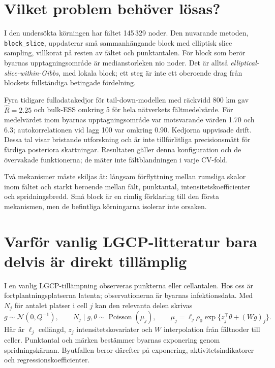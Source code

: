 \documentclass[11pt,a4paper]{article}
\newcommand{\N}{\mathcal N}
\begin{document}
\section{Vilket problem behöver lösas?}

I den undersökta körningen har fältet 145\,329 noder. Den nuvarande metoden, \texttt{block\_slice}, uppdaterar små sammanhängande block med elliptisk slice sampling, villkorat på resten av fältet och punktantalen. För block som berör byarnas upptagningsområde är medianstorleken nio noder. Det är alltså \emph{elliptical-slice-within-Gibbs}, med lokala block; ett steg är inte ett oberoende drag från blockets fullständiga betingade fördelning.

Fyra tidigare fulladatakedjor för tail-down-modellen med räckvidd 800 km gav $\widehat R=2.25$ och bulk-ESS omkring 5 för hela nätverkets fältmedelvärde. För medelvärdet inom byarnas upptagningsområde var motsvarande värden 1.70 och 6.3; autokorrelationen vid lagg 100 var omkring 0.90. Kedjorna uppvisade drift. Dessa tal visar bristande utforskning och är inte tillförlitliga precisionsmått för färdiga posteriora skattningar. Resultaten gäller denna konfiguration och de övervakade funktionerna; de mäter inte fältblandningen i varje CV-fold.

Två mekanismer måste skiljas åt: långsam förflyttning mellan rumsliga skalor inom fältet och starkt beroende mellan fält, punktantal, intensitetskoefficienter och spridningsbredd. Små block är en rimlig förklaring till den första mekanismen, men de befintliga körningarna isolerar inte orsaken.



\section{Varför vanlig LGCP-litteratur bara delvis är direkt tillämplig}

I en vanlig LGCP-tillämpning observeras punkterna eller cellantalen. Hos oss är fortplantningsplatserna latenta; observationerna är byarnas infektionsdata. Med $N_j$ för antalet platser i cell $j$ kan den relevanta delen skrivas
\[
 g\sim\N(0,Q^{-1}),\qquad
 N_j\mid g,\theta\sim\operatorname{Poisson}(\mu_j),\qquad
 \mu_j=\ell_j\rho_0\exp\{z_j^\top\theta+(Wg)_j\}.
\]
Här är $\ell_j$ cellängd, $z_j$ intensitetskovariater och $W$ interpolation från fältnoder till celler. Punktantal och märken bestämmer byarnas exponering genom spridningskärnan. Byutfallen beror därefter på exponering, aktivitetsindikatorer och regressionskoefficienter.
\end{document}
